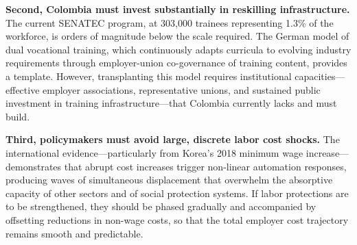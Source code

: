 \documentclass{article}
\begin{document}
\textbf{Second, Colombia must invest substantially in reskilling infrastructure.} The current SENATEC program, at 303,000 trainees representing 1.3\% of the workforce, is orders of magnitude below the scale required. The German model of dual vocational training, which continuously adapts curricula to evolving industry requirements through employer-union co-governance of training content, provides a template. However, transplanting this model requires institutional capacities---effective employer associations, representative unions, and sustained public investment in training infrastructure---that Colombia currently lacks and must build.

\textbf{Third, policymakers must avoid large, discrete labor cost shocks.} The international evidence---particularly from Korea's 2018 minimum wage increase---demonstrates that abrupt cost increases trigger non-linear automation responses, producing waves of simultaneous displacement that overwhelm the absorptive capacity of other sectors and of social protection systems. If labor protections are to be strengthened, they should be phased gradually and accompanied by offsetting reductions in non-wage costs, so that the total employer cost trajectory remains smooth and predictable.
\end{document}
